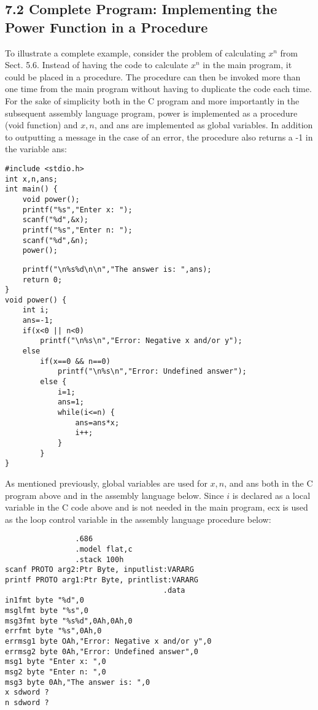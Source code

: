 \documentclass[10pt]{article}
\begin{document}
\subsection*{7.2 Complete Program: Implementing the Power Function in a Procedure}
To illustrate a complete example, consider the problem of calculating $x^{n}$ from Sect. 5.6. Instead of having the code to calculate $x^{n}$ in the main program, it could be placed in a procedure. The procedure can then be invoked more than one time from the main program without having to duplicate the code each time. For the sake of simplicity both in the C program and more importantly in the subsequent assembly language program, power is implemented as a procedure (void function) and $x, n$, and ans are implemented as global variables. In addition to outputting a message in the case of an error, the procedure also returns a -1 in the variable ans:

\begin{verbatim}
#include <stdio.h>
int x,n,ans;
int main() {
    void power();
    printf("%s","Enter x: ");
    scanf("%d",&x);
    printf("%s","Enter n: ");
    scanf("%d",&n);
    power();
\end{verbatim}

\begin{verbatim}
    printf("\n%s%d\n\n","The answer is: ",ans);
    return 0;
}
void power() {
    int i;
    ans=-1;
    if(x<0 || n<0)
        printf("\n%s\n","Error: Negative x and/or y");
    else
        if(x==0 && n==0)
            printf("\n%s\n","Error: Undefined answer");
        else {
            i=1;
            ans=1;
            while(i<=n) {
                ans=ans*x;
                i++;
            }
        }
}
\end{verbatim}

As mentioned previously, global variables are used for $x, n$, and ans both in the C program above and in the assembly language below. Since $i$ is declared as a local variable in the C code above and is not needed in the main program, ecx is used as the loop control variable in the assembly language procedure below:

\begin{verbatim}
                .686
                .model flat,c
                .stack 100h
scanf PROTO arg2:Ptr Byte, inputlist:VARARG
printf PROTO arg1:Ptr Byte, printlist:VARARG
                                    .data
in1fmt byte "%d",0
msglfmt byte "%s",0
msg3fmt byte "%s%d",0Ah,0Ah,0
errfmt byte "%s",0Ah,0
errmsg1 byte OAh,"Error: Negative x and/or y",0
errmsg2 byte 0Ah,"Error: Undefined answer",0
msg1 byte "Enter x: ",0
msg2 byte "Enter n: ",0
msg3 byte 0Ah,"The answer is: ",0
x sdword ?
n sdword ?
\end{verbatim}
\end{document}
